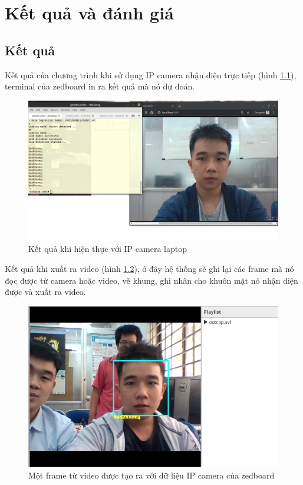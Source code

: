 \documentclass[a4paper]{report}
\begin{document}
\chapter{Kết quả và đánh giá}
\section{Kết quả}

Kết quả của chương trình khi sử dụng IP camera nhận diện trực tiếp (hình \ref{fig:ketqua1}), terminal của zedboard in ra kết quả mà nó dự đoán. 
%
\begin{figure}[H]
\centering
\includegraphics[width=.8\textwidth]{../images/fig/ketqua1.png}
\caption{Kết quả khi hiện thực với IP camera laptop}
\label{fig:ketqua1}
\end{figure}
%
\par \noindent 
Kết quả khi xuất ra video (hình \ref{fig:ketqua2}), ở đây hệ thống sẽ ghi lại các frame mà nó đọc được từ camera hoặc video, vẽ khung, ghi nhãn cho khuôn mặt nó nhận diện được và xuất ra video. 

\begin{figure}[H]
\centering
\includegraphics[width=.8\textwidth]{../images/fig/video1.png}
\caption{Một frame từ video được tạo ra với dữ liệu IP camera của zedboard}
\label{fig:ketqua2}
\end{figure}
\end{document}
